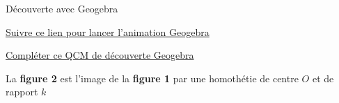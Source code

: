 \begin{activite}
    \begin{myBox}{Découverte avec Geogebra}

        \vspace*{3mm}
        \href{https://www.geogebra.org/classic/wydhjpuc}{ Suivre ce lien pour lancer l'animation Geogebra}

        \vspace*{3mm}
        \href{https://www.geogebra.org/m/vaxxugnh}{ Compléter ce QCM de découverte Geogebra}

        \vspace*{3mm}
    \end{myBox}

    {\large
    }

    \og La \textbf{figure 2} est l'image de la \textbf{figure 1} par une homothétie de centre $O$ et de rapport $k$ \fg


\end{activite}
